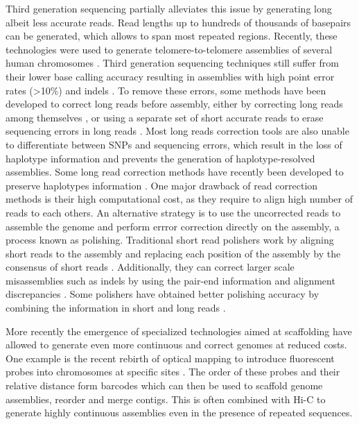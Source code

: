 Third generation sequencing partially alleviates this issue by generating long albeit less accurate reads. Read lengths up to hundreds of thousands of basepairs can be generated, which allows to span most repeated regions. Recently, these technologies were used to generate telomere-to-telomere assemblies of several human chromosomes \cite{migaTelomeretotelomereAssemblyComplete2020}. Third generation sequencing techniques still suffer from their lower base calling accuracy resulting in assemblies with high point error rates (>10\%) and indels \cite{weiratherComprehensiveComparisonPacific2017,jainNanoporeSequencingAssembly2018}. To remove these errors, some methods have been developed to correct long reads before assembly, either by correcting long reads among themselves \cite{morisseScalableLongRead2021}, or using a separate set of short accurate reads to erase sequencing errors in long reads \cite{wangFMLRCHybridLong2018}. Most long reads correction tools are also unable to differentiate between SNPs and sequencing errors, which result in the loss of haplotype information and prevents the generation of haplotype-resolved assemblies. Some long read correction methods have recently been developed to preserve haplotypes information \cite{holleyRatatoskHybridError2021}. One major drawback of read correction methods is their high computational cost, as they require to align high number of reads to each others. An alternative strategy is to use the uncorrected reads to assemble the genome and perform errror correction directly on the assembly, a process known as \Gls{polishing}. Traditional short read polishers work by aligning short reads to the assembly and replacing each position of the assembly by the consensus of short reads \cite{vaserFastAccurateNovo2017}. Additionally, they can correct larger scale misassemblies such as indels by using the pair-end information and alignment discrepancies \cite{walkerPilonIntegratedTool2014}. Some polishers have obtained better polishing accuracy by combining the information in short and long reads \cite{kunduHyPoSuperFast2019}.

More recently the emergence of specialized technologies aimed at scaffolding have allowed to generate even more continuous and correct genomes at reduced costs. One example is the recent rebirth of optical mapping to introduce fluorescent probes into chromosomes at specific sites \cite{lamGenomeMappingNanochannel2012}. The order of these probes and their relative distance form barcodes which can then be used to scaffold genome assemblies, reorder and merge contigs. This is often combined with Hi-C to generate highly continuous assemblies even in the presence of repeated sequences.

